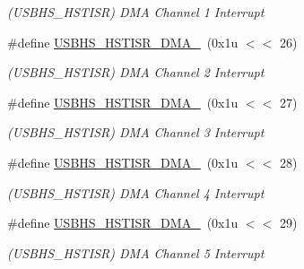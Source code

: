 \begin{DoxyCompactItemize}
\begin{DoxyCompactList}\small\item\em (U\+S\+B\+H\+S\+\_\+\+H\+S\+T\+I\+SR) D\+MA Channel 1 Interrupt \end{DoxyCompactList}\item 
\mbox{\label{group__SAMV71__USBHS_gab3f9d3b959cd003b4a776886a18ea4f1}} 
\#define \mbox{\hyperlink{group__SAMV71__USBHS_gab3f9d3b959cd003b4a776886a18ea4f1}{U\+S\+B\+H\+S\+\_\+\+H\+S\+T\+I\+S\+R\+\_\+\+D\+M\+A\+\_}}~(0x1u $<$$<$ 26)
\begin{DoxyCompactList}\small\item\em (U\+S\+B\+H\+S\+\_\+\+H\+S\+T\+I\+SR) D\+MA Channel 2 Interrupt \end{DoxyCompactList}\item 
\mbox{\label{group__SAMV71__USBHS_gaa2635d3ce3f79939b4bd49adc86c8cb5}} 
\#define \mbox{\hyperlink{group__SAMV71__USBHS_gaa2635d3ce3f79939b4bd49adc86c8cb5}{U\+S\+B\+H\+S\+\_\+\+H\+S\+T\+I\+S\+R\+\_\+\+D\+M\+A\+\_}}~(0x1u $<$$<$ 27)
\begin{DoxyCompactList}\small\item\em (U\+S\+B\+H\+S\+\_\+\+H\+S\+T\+I\+SR) D\+MA Channel 3 Interrupt \end{DoxyCompactList}\item 
\mbox{\label{group__SAMV71__USBHS_gaed42ea806678b1da3552cfaea2dd4d60}} 
\#define \mbox{\hyperlink{group__SAMV71__USBHS_gaed42ea806678b1da3552cfaea2dd4d60}{U\+S\+B\+H\+S\+\_\+\+H\+S\+T\+I\+S\+R\+\_\+\+D\+M\+A\+\_}}~(0x1u $<$$<$ 28)
\begin{DoxyCompactList}\small\item\em (U\+S\+B\+H\+S\+\_\+\+H\+S\+T\+I\+SR) D\+MA Channel 4 Interrupt \end{DoxyCompactList}\item 
\mbox{\label{group__SAMV71__USBHS_gaf0dbc9654f5ac451ec8bf9dcd61f4ba0}} 
\#define \mbox{\hyperlink{group__SAMV71__USBHS_gaf0dbc9654f5ac451ec8bf9dcd61f4ba0}{U\+S\+B\+H\+S\+\_\+\+H\+S\+T\+I\+S\+R\+\_\+\+D\+M\+A\+\_}}~(0x1u $<$$<$ 29)
\begin{DoxyCompactList}\small\item\em (U\+S\+B\+H\+S\+\_\+\+H\+S\+T\+I\+SR) D\+MA Channel 5 Interrupt \end{DoxyCompactList}\item 

\end{DoxyCompactItemize}
